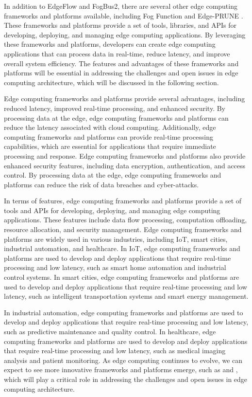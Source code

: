 \documentclass[11pt]{article}
\begin{document}
In addition to EdgeFlow and FogBus2, there are several other edge computing frameworks and platforms available, including Fog Function \cite{ref34} and Edge-PRUNE \cite{ref35}. These frameworks and platforms provide a set of tools, libraries, and APIs for developing, deploying, and managing edge computing applications. By leveraging these frameworks and platforms, developers can create edge computing applications that can process data in real-time, reduce latency, and improve overall system efficiency. The features and advantages of these frameworks and platforms will be essential in addressing the challenges and open issues in edge computing architecture, which will be discussed in the following section.

Edge computing frameworks and platforms provide several advantages, including reduced latency, improved real-time processing, and enhanced security. By processing data at the edge, edge computing frameworks and platforms can reduce the latency associated with cloud computing. Additionally, edge computing frameworks and platforms can provide real-time processing capabilities, which are essential for applications that require immediate processing and response. Edge computing frameworks and platforms also provide enhanced security features, including data encryption, authentication, and access control. By processing data at the edge, edge computing frameworks and platforms can reduce the risk of data breaches and cyber-attacks.

In terms of features, edge computing frameworks and platforms provide a set of tools and APIs for developing, deploying, and managing edge computing applications. These features include data flow processing, computation offloading, resource allocation, and security management. Edge computing frameworks and platforms are widely used in various industries, including IoT, smart cities, industrial automation, and healthcare. In IoT, edge computing frameworks and platforms are used to develop and deploy applications that require real-time processing and low latency, such as smart home automation and industrial control systems. In smart cities, edge computing frameworks and platforms are used to develop and deploy applications that require real-time processing and low latency, such as intelligent transportation systems and smart energy management.

In industrial automation, edge computing frameworks and platforms are used to develop and deploy applications that require real-time processing and low latency, such as predictive maintenance and quality control. In healthcare, edge computing frameworks and platforms are used to develop and deploy applications that require real-time processing and low latency, such as medical imaging analysis and patient monitoring. As edge computing continues to evolve, we can expect to see more innovative frameworks and platforms emerge, such as \cite{ref34} and \cite{ref35}, which will play a critical role in addressing the challenges and open issues in edge computing architecture.
\end{document}
